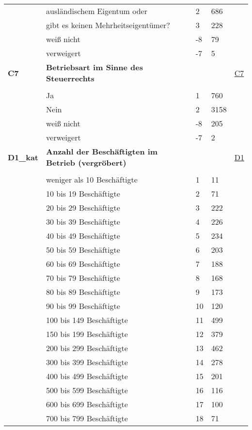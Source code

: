\begin{longtable}{| L{2.5cm} | L{8.25cm}| C{1.5cm} | R{1.25cm} | C{2.25cm} |  }
   & ausländischem Eigentum oder & 2 & 686 &  \\ 
   & gibt es keinen Mehrheitseigentümer? & 3 & 228 &  \\ 
   & weiß nicht & -8 & 79 &  \\ 
   & verweigert & -7 & 5 &  \\ 
   \midrule
\textbf{C7}\label{var:suf:C7} & \textbf{Betriebsart im Sinne des Steuerrechts} &  &  & \hyperref[C7]{C7} \\ 
   &  &  &  &  \\ 
   & Ja & 1 & 760 &  \\ 
   & Nein & 2 & 3158 &  \\ 
   & weiß nicht & -8 & 205 &  \\ 
   & verweigert & -7 & 2 &  \\ 
   \midrule
\textbf{D1\_kat}\label{var:suf:D1:kat} & \textbf{Anzahl der Beschäftigten im Betrieb (vergröbert)} &  &  & \hyperref[D1]{D1} \\ 
   &  &  &  &  \\ 
   & weniger als 10 Beschäftigte & 1 & 11 &  \\ 
   & 10 bis 19 Beschäftigte & 2 & 71 &  \\ 
   & 20 bis 29 Beschäftigte & 3 & 222 &  \\ 
   & 30 bis 39 Beschäftigte & 4 & 226 &  \\ 
   & 40 bis 49 Beschäftigte & 5 & 234 &  \\ 
   & 50 bis 59 Beschäftigte & 6 & 203 &  \\ 
   & 60 bis 69 Beschäftigte & 7 & 188 &  \\ 
   & 70 bis 79 Beschäftigte & 8 & 168 &  \\ 
   & 80 bis 89 Beschäftigte & 9 & 173 &  \\ 
   & 90 bis 99 Beschäftigte & 10 & 120 &  \\ 
   & 100 bis 149 Beschäftigte & 11 & 499 &  \\ 
   & 150 bis 199 Beschäftigte & 12 & 379 &  \\ 
   & 200 bis 299 Beschäftigte & 13 & 462 &  \\ 
   & 300 bis 399 Beschäftigte & 14 & 278 &  \\ 
   & 400 bis 499 Beschäftigte & 15 & 201 &  \\ 
   & 500 bis 599 Beschäftigte & 16 & 116 &  \\ 
   & 600 bis 699 Beschäftigte & 17 & 100 &  \\ 
   & 700 bis 799 Beschäftigte & 18 & 71 &  \\ 

\end{longtable}
